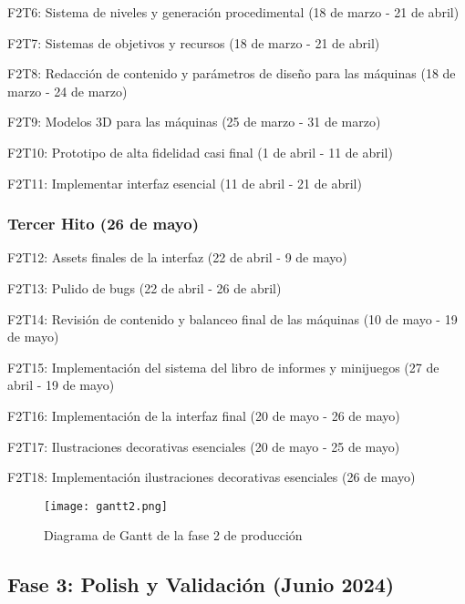 \begin{compactitem}
\item F2T6: Sistema de niveles y generación procedimental (18 de marzo - 21 de abril)
\item F2T7: Sistemas de objetivos y recursos (18 de marzo - 21 de abril)
\item F2T8: Redacción de contenido y parámetros de diseño para las máquinas (18 de marzo - 24 de marzo)
\item F2T9: Modelos 3D para las máquinas (25 de marzo - 31 de marzo)
\item F2T10: Prototipo de alta fidelidad casi final (1 de abril - 11 de abril)
\item F2T11: Implementar interfaz esencial (11 de abril - 21 de abril)
\end{compactitem}

\subsubsection{Tercer Hito (26 de mayo)}

\begin{compactitem}
\item F2T12: Assets finales de la interfaz (22 de abril - 9 de mayo)
\item F2T13: Pulido de bugs (22 de abril - 26 de abril)
\item F2T14: Revisión de contenido y balanceo final de las máquinas (10 de mayo - 19 de mayo)
\item F2T15: Implementación del sistema del libro de informes y minijuegos (27 de abril - 19 de mayo)
\item F2T16: Implementación de la interfaz final (20 de mayo - 26 de mayo)
\item F2T17: Ilustraciones decorativas esenciales (20 de mayo - 25 de mayo)
\item F2T18: Implementación ilustraciones decorativas esenciales (26 de mayo)
\end{compactitem}

\begin{figure}[H]
  \centering
	\texttt{[image: gantt2.png]}
  \caption{Diagrama de Gantt de la fase 2 de producción}
  \label{fig:fase2gantt}
\end{figure}

\subsection{Fase 3: Polish y Validación (Junio 2024)}


